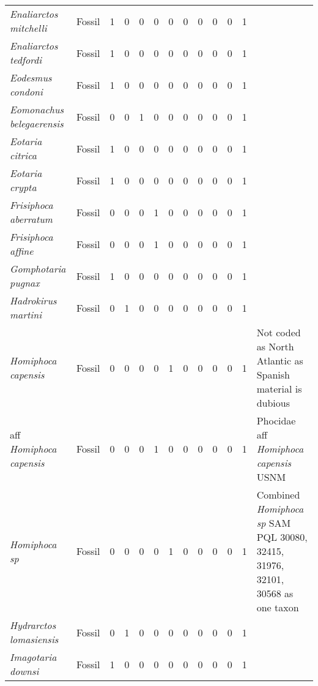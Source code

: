 \begin{longtable}{llccccccccccp{}}
\textit{Enaliarctos mitchelli} &
Fossil &
1 &
0 &
0 &
0 &
0 &
0 &
0 &
0 &
0 &
1 &
\\

\textit{Enaliarctos tedfordi} &
Fossil &
1 &
0 &
0 &
0 &
0 &
0 &
0 &
0 &
0 &
1 &
\\

\textit{Eodesmus condoni} &
Fossil &
1 &
0 &
0 &
0 &
0 &
0 &
0 &
0 &
0 &
1 &
\\

\textit{Eomonachus belegaerensis} &
Fossil &
0 &
0 &
1 &
0 &
0 &
0 &
0 &
0 &
0 &
1 &
\\

\textit{Eotaria citrica} &
Fossil &
1 &
0 &
0 &
0 &
0 &
0 &
0 &
0 &
0 &
1 &
\\

\textit{Eotaria crypta} &
Fossil &
1 &
0 &
0 &
0 &
0 &
0 &
0 &
0 &
0 &
1 &
\\

\textit{Frisiphoca aberratum} &
Fossil &
0 &
0 &
0 &
1 &
0 &
0 &
0 &
0 &
0 &
1 &
\\

\textit{Frisiphoca affine} &
Fossil &
0 &
0 &
0 &
1 &
0 &
0 &
0 &
0 &
0 &
1 &
\\

\textit{Gomphotaria pugnax} &
Fossil &
1 &
0 &
0 &
0 &
0 &
0 &
0 &
0 &
0 &
1 &
\\

\textit{Hadrokirus martini} &
Fossil &
0 &
1 &
0 &
0 &
0 &
0 &
0 &
0 &
0 &
1 &
\\

\textit{Homiphoca capensis} &
Fossil &
0 &
0 &
0 &
0 &
1 &
0 &
0 &
0 &
0 &
1 &
Not coded as North Atlantic as Spanish material is dubious\\

aff \textit{Homiphoca capensis} &
Fossil &
0 &
0 &
0 &
1 &
0 &
0 &
0 &
0 &
0 &
1 &
Phocidae aff \textit{Homiphoca capensis} USNM\\

\textit{Homiphoca sp} &
Fossil &
0 &
0 &
0 &
0 &
1 &
0 &
0 &
0 &
0 &
1 &
Combined \textit{Homiphoca sp} SAM PQL 30080, 32415, 31976, 32101, 30568 as one taxon\\

\textit{Hydrarctos lomasiensis} &
Fossil &
0 &
1 &
0 &
0 &
0 &
0 &
0 &
0 &
0 &
1 &
\\

\textit{Imagotaria downsi} &
Fossil &
1 &
0 &
0 &
0 &
0 &
0 &
0 &
0 &
0 &
1 &
\\


\end{longtable}
